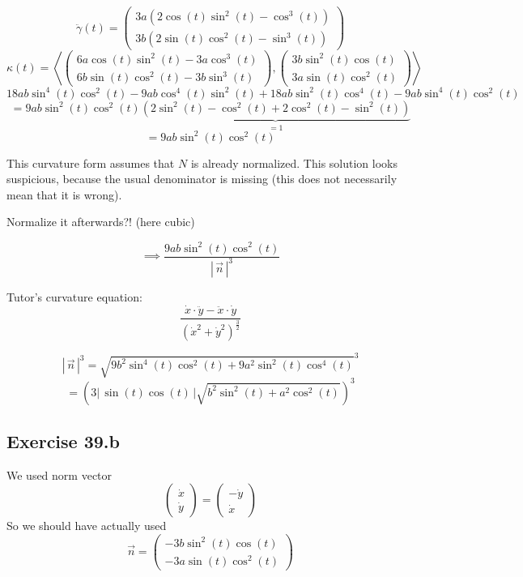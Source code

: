 \documentclass[a4paper]{article}
\theoremstyle{definition}
\newcommand\abs[1]{\left|\,#1\,\right|}
\begin{document}
\[ \ddot{\gamma}(t) =
   \begin{pmatrix}
    3a (2\cos(t) \sin^2(t) - \cos^3(t)) \\
    3b (2\sin(t) \cos^2(t) - \sin^3(t))
   \end{pmatrix}
\] \[
\kappa(t) = \left\langle \begin{pmatrix}
  6a \cos(t) \sin^2(t) - 3a \cos^3(t) \\
  6b \sin(t) \cos^2(t) - 3b \sin^3(t)
\end{pmatrix}, \begin{pmatrix}
  3b \sin^2(t) \cos(t) \\
  3a \sin(t) \cos^2(t)
\end{pmatrix}\right\rangle
\]
\[
18ab \sin^4(t) \cos^2(t) - 9 ab \cos^4(t) \sin^2(t) + 18ab \sin^2(t) \cos^4(t) - 9ab\sin^4(t) \cos^2(t)
\] \[
= 9ab \sin^2(t) \cos^2(t) \underbrace{\left(2\sin^2(t) - \cos^2(t) + 2\cos^2(t) - \sin^2(t)\right)}_{=1}
\] \[
= 9ab \sin^2(t) \cos^2(t)
\]

This curvature form assumes that $N$ is already normalized.
This solution looks suspicious, because the usual denominator is missing (this does not necessarily mean that it is wrong).

Normalize it afterwards?! (here cubic)

\[ \implies \frac{9ab \sin^2(t) \cos^2(t)}{\abs{\vec{n}}^3} \]

Tutor's curvature equation:
\[ \frac{\dot{x} \cdot \ddot{y} - \ddot{x} \cdot \dot{y}}{\left(\dot{x}^2 + \dot{y}^2\right)^{\frac32}} \]

\[ \abs{\vec{n}}^3 = \sqrt{9b^2 \sin^4(t) \cos^2(t) + 9a^2 \sin^2(t) \cos^4(t)}^3 \]
\[ = \left(3 \abs{\sin(t) \cos(t)} \sqrt{b^2 \sin^2(t) + a^2 \cos^2(t)}\right)^3 \]

\subsection{Exercise 39.b}

We used norm vector
\[ \begin{pmatrix} \dot{x} \\ \dot{y} \end{pmatrix} = \begin{pmatrix} -\dot{y} \\ \dot{x} \end{pmatrix} \]
So we should have actually used
\[
   \vec{n} =
   \begin{pmatrix}
    -3b \sin^2(t) \cos(t) \\
    -3a \sin(t) \cos^2(t)
  \end{pmatrix}
\]
\end{document}
